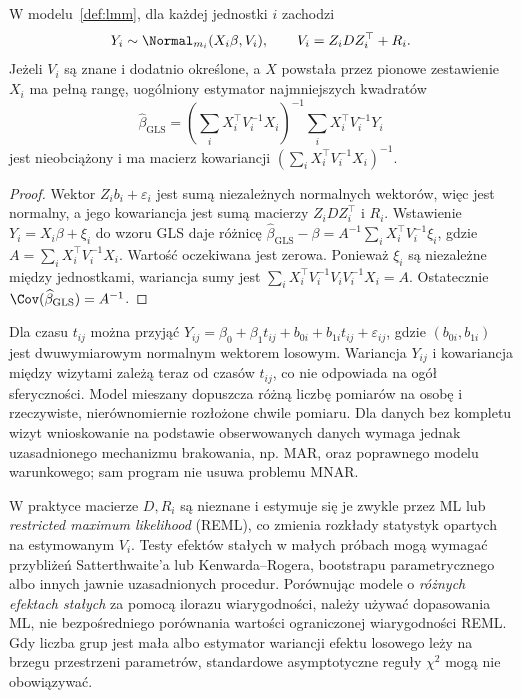\begin{twierdzenie}\label{thm:lmm-marginal}
W modelu~\ref{def:lmm}, dla każdej jednostki $i$ zachodzi
\[
 Y_i\sim\Normal_{m_i}(X_i\beta,V_i),\qquad V_i=Z_iDZ_i^\top+R_i.
\]
Jeżeli $V_i$ są znane i dodatnio określone, a $X$ powstała przez pionowe zestawienie $X_i$ ma pełną rangę, uogólniony estymator najmniejszych kwadratów
\[
 \widehat\beta_{\mathrm{GLS}}=\left(\sum_iX_i^\top V_i^{-1}X_i\right)^{-1}\sum_iX_i^\top V_i^{-1}Y_i
\]
jest nieobciążony i ma macierz kowariancji $\left(\sum_iX_i^\top V_i^{-1}X_i\right)^{-1}$.
\end{twierdzenie}
\begin{proof}
Wektor $Z_ib_i+\varepsilon_i$ jest sumą niezależnych normalnych wektorów, więc jest normalny, a jego kowariancja jest sumą macierzy $Z_iDZ_i^\top$ i $R_i$. Wstawienie $Y_i=X_i\beta+\xi_i$ do wzoru GLS daje różnicę $\widehat\beta_{\mathrm{GLS}}-\beta=A^{-1}\sum_iX_i^\top V_i^{-1}\xi_i$, gdzie $A=\sum_iX_i^\top V_i^{-1}X_i$. Wartość oczekiwana jest zerowa. Ponieważ $\xi_i$ są niezależne między jednostkami, wariancja sumy jest $\sum_iX_i^\top V_i^{-1}V_iV_i^{-1}X_i=A$. Ostatecznie $\Cov(\widehat\beta_{\mathrm{GLS}})=A^{-1}$.
\end{proof}

\begin{przyklad}
Dla czasu $t_{ij}$ można przyjąć $Y_{ij}=\beta_0+\beta_1t_{ij}+b_{0i}+b_{1i}t_{ij}+\varepsilon_{ij}$, gdzie $(b_{0i},b_{1i})$ jest dwuwymiarowym normalnym wektorem losowym. Wariancja $Y_{ij}$ i kowariancja między wizytami zależą teraz od czasów $t_{ij}$, co nie odpowiada na ogół sferyczności. Model mieszany dopuszcza różną liczbę pomiarów na osobę i rzeczywiste, nierównomiernie rozłożone chwile pomiaru. Dla danych bez kompletu wizyt wnioskowanie na podstawie obserwowanych danych wymaga jednak uzasadnionego mechanizmu brakowania, np. MAR, oraz poprawnego modelu warunkowego; sam program nie usuwa problemu MNAR.
\end{przyklad}

\begin{uwaga}
W praktyce macierze $D,R_i$ są nieznane i estymuje się je zwykle przez ML lub \emph{restricted maximum likelihood} (REML), co zmienia rozkłady statystyk opartych na estymowanym $V_i$. Testy efektów stałych w małych próbach mogą wymagać przybliżeń Satterthwaite'a lub Kenwarda--Rogera, bootstrapu parametrycznego albo innych jawnie uzasadnionych procedur. Porównując modele o \emph{różnych efektach stałych} za pomocą ilorazu wiarygodności, należy używać dopasowania ML, nie bezpośredniego porównania wartości ograniczonej wiarygodności REML. Gdy liczba grup jest mała albo estymator wariancji efektu losowego leży na brzegu przestrzeni parametrów, standardowe asymptotyczne reguły $\chi^2$ mogą nie obowiązywać.
\end{uwaga}

